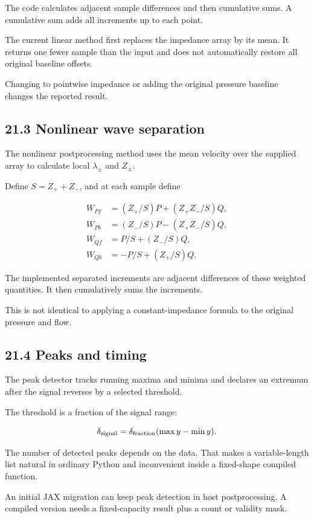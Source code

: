 \documentclass[11pt,a4paper]{article}
\begin{document}
The code calculates adjacent sample differences and then cumulative sums. A cumulative sum adds all increments up to each point.

The current linear method first replaces the impedance array by its mean. It returns one fewer sample than the input and does not automatically restore all original baseline offsets.

Changing to pointwise impedance or adding the original pressure baseline changes the reported result.

\subsection{21.3 Nonlinear wave separation}
The nonlinear postprocessing method uses the mean velocity over the supplied array to calculate local \(\lambda_\pm\) and \(Z_\pm\).

Define \(S=Z_++Z_-\), and at each sample define


\begingroup\small
\[
\begin{aligned}
W_{Pf}&=(Z_+/S)P+(Z_+Z_-/S)Q,\\
W_{Pb}&=(Z_-/S)P-(Z_+Z_-/S)Q,\\
W_{Qf}&=P/S+(Z_-/S)Q,\\
W_{Qb}&=-P/S+(Z_+/S)Q.
\end{aligned}
\]
\endgroup


The implemented separated increments are adjacent differences of these weighted quantities. It then cumulatively sums the increments.

This is not identical to applying a constant-impedance formula to the original pressure and flow.

\subsection{21.4 Peaks and timing}
The peak detector tracks running maxima and minima and declares an extremum after the signal reverses by a selected threshold.

The threshold is a fraction of the signal range:


\begingroup\small
\[
\delta_{\rm signal}
=\delta_{\rm fraction}(\max y-\min y).
\]
\endgroup


The number of detected peaks depends on the data. That makes a variable-length list natural in ordinary Python and inconvenient inside a fixed-shape compiled function.

An initial JAX migration can keep peak detection in host postprocessing. A compiled version needs a fixed-capacity result plus a count or validity mask.
\end{document}
